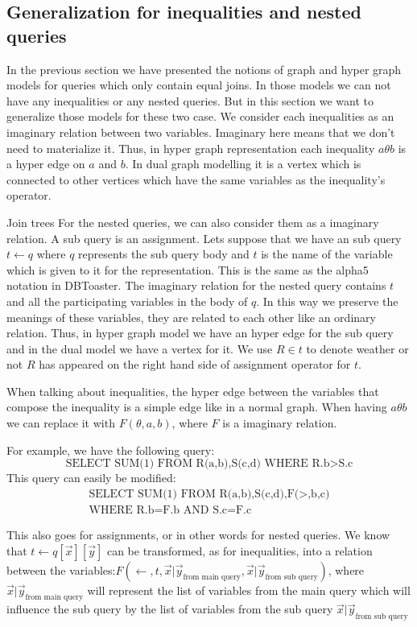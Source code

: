 \documentclass[12pt]{article}
\begin{document}
\subsection{Generalization for inequalities and nested queries}
\label{sec:generalization}
In the previous section we have presented the notions of graph and hyper graph models for queries which only contain equal joins. In those models we can not have any inequalities or any nested queries. But in this section we want to generalize those models for these two case. We consider each inequalities as an imaginary relation between two variables. Imaginary here means that we don't need to materialize it. Thus, in hyper graph representation each inequality $a\theta b$ is a hyper edge on $a$ and $b$. In dual graph modelling it is a vertex which is connected to other vertices which have the same variables as the inequality's operator.\\\par
Join trees 
For the nested queries, we can also consider them as a imaginary relation. A sub query is an assignment. Lets suppose that we have an sub query $t\gets q$ where $q$ represents the sub query body and $t$ is the name of the variable which is given to it for the representation. This is the same as the alpha5 notation in DBToaster\cite{1}. The imaginary relation for the nested query contains $t$ and all the participating variables in the body of $q$. In this way we preserve the meanings of these variables, they are related to each other like an ordinary relation. Thus, in hyper graph model we have an hyper edge for the sub query and in the dual model we have a vertex for it. We use $R\in t$ to denote weather or not $R$ has appeared on the right hand side of assignment operator for $t$. \\\par
When talking about inequalities, the hyper edge between the variables that compose the inequality is a simple edge like in a normal graph. When having $a\theta b$ we can replace it with $F(\theta,a,b)$, where $F$ is a imaginary relation. 

For example, we have the following query:
$$\mbox{SELECT SUM(1) FROM R(a,b),S(c,d) WHERE R.b$>$S.c}$$
This query can easily be modified:
\begin{align*}
\mbox{SELECT SUM(1) FROM R(a,b),S(c,d),F($>$,b,c)}\\\mbox{WHERE R.b=F.b AND S.c=F.c}
\end{align*}

This also goes for assignments, or in other words for nested queries. We know that $t\gets q[\vec{x}][\vec{y}]$ can be transformed, as for inequalities, into a relation between the variables:$F(\gets,t,{\vec{x}|\vec{y}}_{\mbox{from main query}},{\vec{x}|\vec{y}}_{\mbox{from sub query}})$, where ${\vec{x}|\vec{y}}_{\mbox{from main query}}$ will represent the list of variables from the main query which will influence the sub query by the list of variables from the sub query $ {\vec{x}|\vec{y}}_{\mbox{from sub query}}$
\end{document}
